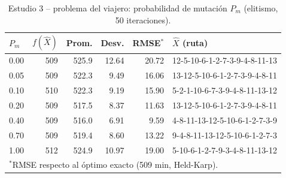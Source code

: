 \begin{table}[!t]
\centering
\scriptsize
\setlength{\tabcolsep}{2.5pt}
\caption{Estudio 3 -- problema del viajero: probabilidad de mutaci\'on $P_m$ (elitismo, 50 iteraciones).}
\label{tab:t3v}
\begin{tabular}{lrrrrl}
\hline
$P_m$ & $f(\hat{X})$ & Prom. & Desv. & RMSE$^*$ & $\hat{X}$ (ruta) \\
\hline
0.00 & 509 & 525.9 & 12.64 & 20.72 & 12-5-10-6-1-2-7-3-9-4-8-11-13 \\
0.05 & 509 & 522.3 & 9.49 & 16.06 & 13-12-5-10-6-1-2-7-3-9-4-8-11 \\
0.10 & 510 & 522.3 & 9.19 & 15.90 & 5-2-1-10-6-7-3-9-4-8-11-13-12 \\
0.20 & 509 & 517.5 & 8.37 & 11.63 & 13-12-5-10-6-1-2-7-3-9-4-8-11 \\
0.40 & 509 & 516.0 & 6.91 & 9.59 & 4-8-11-13-12-5-10-6-1-2-7-3-9 \\
0.70 & 509 & 519.4 & 8.60 & 13.22 & 9-4-8-11-13-12-5-10-6-1-2-7-3 \\
1.00 & 512 & 524.9 & 10.97 & 19.00 & 5-10-6-1-2-7-9-3-4-8-11-13-12 \\
\hline
\multicolumn{6}{l}{$^*$RMSE respecto al \'optimo exacto (509 min, Held-Karp).}
\end{tabular}
\end{table}
